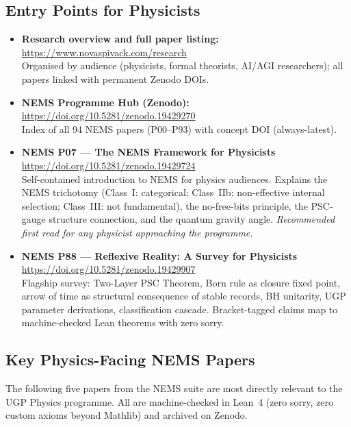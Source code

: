 \documentclass[11pt]{article}
\begin{document}
\subsection{Entry Points for Physicists}

\begin{itemize}[leftmargin=1.5em,itemsep=0.4em]
  \item \textbf{Research overview and full paper listing:}
    \url{https://www.novaspivack.com/research}\\
    Organised by audience (physicists, formal theorists, AI/AGI researchers);
    all papers linked with permanent Zenodo DOIs.

  \item \textbf{NEMS Programme Hub (Zenodo):}~\cite{SpivackNEMSHub}
    \url{https://doi.org/10.5281/zenodo.19429270}\\
    Index of all 94 NEMS papers (P00--P93) with concept DOI (always-latest).

  \item \textbf{NEMS P07 — The NEMS Framework for Physicists}~\cite{SpivackNEMS07}
    \url{https://doi.org/10.5281/zenodo.19429724}\\
    Self-contained introduction to NEMS for physics audiences.  Explains the
    NEMS trichotomy (Class~I: categorical; Class~IIb: non-effective internal
    selection; Class~III: not fundamental), the no-free-bits principle,
    the PSC-gauge structure connection, and the quantum gravity angle.
    \emph{Recommended first read for any physicist approaching the programme.}

  \item \textbf{NEMS P88 --- Reflexive Reality: A Survey for Physicists}~\cite{SpivackNEMS88}
    \url{https://doi.org/10.5281/zenodo.19429907}\\
    Flagship survey: Two-Layer PSC Theorem, Born rule as closure fixed point,
    arrow of time as structural consequence of stable records, BH unitarity,
    UGP parameter derivations, classification cascade.  Bracket-tagged claims
    map to machine-checked Lean theorems with zero sorry.
\end{itemize}

\subsection{Key Physics-Facing NEMS Papers}

The following five papers from the NEMS suite are most directly relevant to the
UGP Physics programme.  All are machine-checked in Lean~4 (zero sorry, zero
custom axioms beyond Mathlib) and archived on Zenodo.
\end{document}
